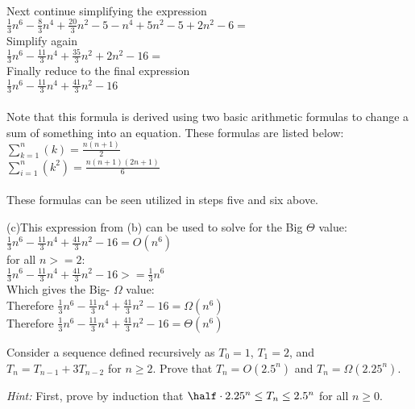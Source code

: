 \documentclass{article}
\begin{document}
\begin{solution}
\begin{description}
\\Next continue simplifying the expression
\\ $\frac{1}{3}n^6 - \frac{8}{3}n^4 + \frac{20}{3}n^2 - 5 - n^4+5n^2-5+2n^2-6 =$
\newline
\\Simplify again
\\ $\frac{1}{3}n^6 - \frac{11}{3}n^4 + \frac{35}{3}n^2 + 2n^2 -16 =$
\newline
\\Finally reduce to the final expression
\\ $\frac{1}{3}n^6 - \frac{11}{3}n^4 + \frac{41}{3}n^2 - 16$
\\\\Note that this formula is derived using two basic arithmetic formulas to change a sum of something into an equation.  These formulas are listed below:
\\ $\sum_{k=1}^{n}(k) = \frac{n(n+1)}{2}$
\\ $\sum_{i=1}^{n}(k^2) = \frac{n(n+1)(2n+1)}{6}$
\\\\These formulas can be seen utilized in steps five and six above.
\newline
\item{(c)}This expression from (b) can be used to solve for the Big $\Theta$ value:
\\ $\frac{1}{3}n^6 - \frac{11}{3}n^4 + \frac{41}{3}n^2 - 16 = O(n^6)$
\newline
\\ for all $n>=2$:
\\ $\frac{1}{3}n^6 - \frac{11}{3}n^4 + \frac{41}{3}n^2 - 16 >= \frac{1}{3}n^6$
\newline
\\Which gives the Big- $\Omega$ value:
\\ Therefore $\frac{1}{3}n^6 - \frac{11}{3}n^4 + \frac{41}{3}n^2 - 16 = \Omega (n^6)$
\newline
\\ Therefore $\frac{1}{3}n^6 - \frac{11}{3}n^4 + \frac{41}{3}n^2 - 16 = \Theta (n^6)$

\end{description}
\end{solution}


\begin{problem}
Consider a sequence defined recursively as
$T_0 = 1$, $T_1 = 2$, and $T_n = T_{n-1}+3T_{n-2}$ for
$n\ge 2$. Prove that $T_n = O(2.5^n)$ and $T_n = \Omega(2.25^n)$.

\smallskip
\noindent
\emph{Hint:} 
First, prove by induction that $\half\cdot 2.25^n \le T_n \le 2.5^n$ for all $n\ge 0$.
\end{problem}
\end{document}
